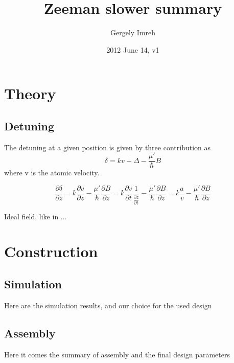 \documentclass[12pt,a4paper]{article}
\author{Gergely Imreh}
\title{Zeeman slower summary}
\date{2012 June 14, v1}
\begin{document}
\maketitle

\section{Theory}

\subsection{Detuning}

The detuning at a given position is given by three contribution as
\begin{equation}
\delta = k v + \Delta - \frac{\mu'}{\hbar} B
\end{equation}
where v is the atomic velocity.

\begin{equation}
\frac{\partial \delta}{\partial z} = k \frac{\partial v}{\partial z} - \frac{\mu'}{\hbar}\frac{\partial B}{\partial z} = k \frac{\partial v}{\partial t} \frac{1} {\frac{\partial z}{\partial t}} - \frac{\mu'}{\hbar}\frac{\partial B}{\partial z}
= k \frac {a}{v} - \frac{\mu'}{\hbar}\frac{\partial B}{\partial z}
\end{equation}

Ideal field, like in \cite{Bell2010}...

\section{Construction}

\subsection{Simulation}

Here are the simulation results, and our choice for the used design

\subsection{Assembly}

Here it comes the summary of assembly and the final design parameters



\end{document}
